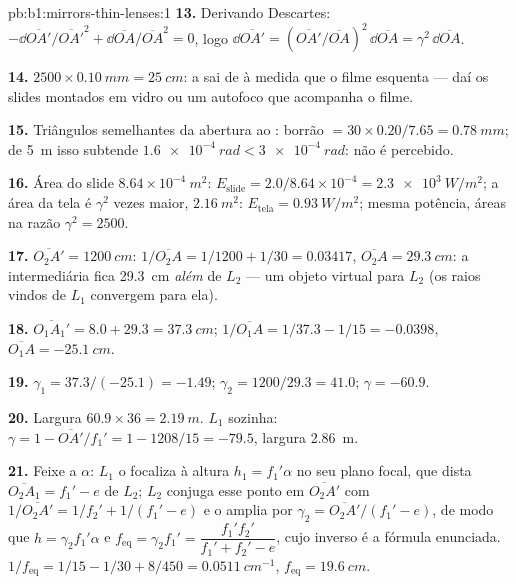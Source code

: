 \begin{solution}{pb:b1:mirrors-thin-lenses:1}
\textbf{13.} Derivando Descartes: $-\dd\overline{OA'}/\overline{OA'}^2
+ \dd\overline{OA}/\overline{OA}^2 = 0$, logo $\dd\overline{OA'} =
(\overline{OA'}/\overline{OA})^2\,\dd\overline{OA} = \gamma^2\,\dd\overline{OA}$.

\textbf{14.} $2500 \times \qty{0.10}{mm} = \qty{25}{cm}$: a 
sai de  à medida que o filme esquenta --- daí os slides montados em vidro ou
um autofoco que acompanha o filme.

\textbf{15.} Triângulos semelhantes da abertura ao :
borrão $= 30 \times 0.20/7.65 = \qty{0.78}{mm}$; de \qty{5}{m} isso
subtende $\qty{1.6e-4}{rad} < \qty{3e-4}{rad}$: não é percebido.

\textbf{16.} Área do slide $8.64\times10^{-4}\ \unit{m^2}$: $E_{\text{slide}}
= 2.0/8.64\times10^{-4} = \qty{2.3e3}{W/m^2}$; a área da tela é $\gamma^2$
vezes maior, $\qty{2.16}{m^2}$: $E_{\text{tela}} = \qty{0.93}{W/m^2}$;
mesma potência, áreas na razão $\gamma^2 = 2500$.

\textbf{17.} $\overline{O_2A'} = \qty{1200}{cm}$: $1/\overline{O_2A} =
1/1200 + 1/30 = 0.03417$, $\overline{O_2A} = \qty{+29.3}{cm}$: a
 intermediária fica \qty{29.3}{cm} \emph{além} de $L_2$ --- um objeto
virtual para $L_2$ (os raios vindos de $L_1$ convergem para ela).

\textbf{18.} $\overline{O_1A_1'} = 8.0 + 29.3 = \qty{37.3}{cm}$;
$1/\overline{O_1A} = 1/37.3 - 1/15 = -0.0398$, $\overline{O_1A} =
\qty{-25.1}{cm}$.

\textbf{19.} $\gamma_1 = 37.3/(-25.1) = -1.49$; $\gamma_2 = 1200/29.3 =
41.0$; $\gamma = -60.9$.

\textbf{20.} Largura $60.9 \times 36 = \qty{2.19}{m}$. $L_1$ sozinha:
$\gamma = 1 - \overline{OA'}/f_1' = 1 - 1208/15 = -79.5$, largura
\qty{2.86}{m}.

\textbf{21.} Feixe a $\alpha$: $L_1$ o focaliza à altura $h_1 = f_1'\alpha$
no seu plano focal, que dista $\overline{O_2A_1} = f_1' - e$ de $L_2$;
$L_2$ conjuga esse ponto em $\overline{O_2A'}$ com $1/\overline{O_2A'}
= 1/f_2' + 1/(f_1' - e)$ e o amplia por $\gamma_2 = \overline{O_2A'}/(f_1'
- e)$, de modo que $h = \gamma_2 f_1'\alpha$ e $f_{\mathrm{eq}} = \gamma_2 f_1'
= \dfrac{f_1' f_2'}{f_1' + f_2' - e}$, cujo inverso é a fórmula
enunciada. $1/f_{\mathrm{eq}} = 1/15 - 1/30 + 8/450 = \qty{0.0511}{cm^{-1}}$,
$f_{\mathrm{eq}} = \qty{19.6}{cm}$.


\end{solution}
